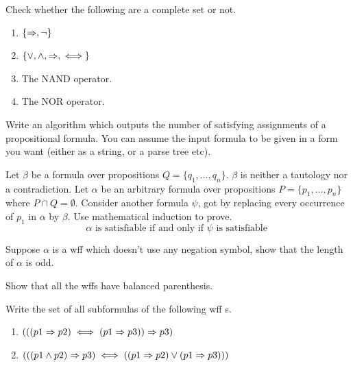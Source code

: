 \begin{exercise}
Check whether the following are a complete set or not. 
\begin{multicols}{2}
\begin{enumerate}
\item $\{\Rightarrow, \neg\}$
\item $\{\vee, \wedge, \Rightarrow, \iff \}$
\item The NAND operator.
\item The NOR operator.
\end{enumerate}
\end{multicols}
\end{exercise}

\begin{exercise}
Write an algorithm which outputs the number of satisfying assignments of a propositional formula. You can assume the input formula to be given in a form you want (either as a string, or a parse tree etc).
\end{exercise}

\begin{exercise}
Let $\beta$ be a formula over propositions $Q=\{q_1,\dots,q_n\}$. $\beta$ is neither a tautology nor a contradiction. Let $\alpha$ be an arbitrary formula over propositions $P=\{p_1,\dots,p_n\}$ where $P \cap Q = \emptyset$. Consider another formula $\psi$, got by replacing every occurrence of $p_1$ in $\alpha$ by $\beta$. Use mathematical induction to prove.
\[
\alpha \mbox{ is satisfiable if and only if } \psi \mbox{ is satisfiable }
\]
\end{exercise}

\begin{exercise}
Suppose $\alpha$ is a wff which doesn’t use any negation symbol, show that the length of $\alpha$ is odd.
\end{exercise}

\begin{exercise}
Show that all the wffs have balanced parenthesis.
\end{exercise}

\begin{exercise}
Write the set of all subformulas of the following wff s. 
\begin{enumerate}
\item $(((p1 \Rightarrow p2)\iff (p1 \Rightarrow p3))\Rightarrow p3)$
\item $(((p1 \wedge p2)\Rightarrow p3)\iff ((p1 \Rightarrow p2)\vee (p1 \Rightarrow p3)))$
\end{enumerate}
\end{exercise}

